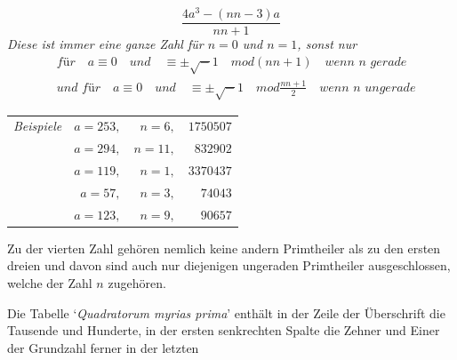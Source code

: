 \[
\frac{4a^3-(nn-3)a}{nn+1}
\]
\textit{Diese ist immer eine ganze Zahl für $n=0$ und $n=1$, sonst nur}
\[
\begin{aligned}
&\textit{für}\quad a\equiv0\quad\textit{und}\quad\equiv\pm\surd-1\quad mod(nn+1)\quad\textit{wenn }n\textit{ gerade}\\
&\textit{und für}\quad a\equiv0\quad\textit{und}\quad\equiv\pm\surd-1\quad mod\frac{nn+1}{2}\quad\textit{wenn }n\textit{ ungerade}
\end{aligned}
\]
\begin{center}
\begin{tabular}{lrrr}
\textit{Beispiele} & $a=253,$ & $n=6,$ & $1750507$\\
 & $a=294,$ & $n=11,$ & $832902$\\
 & $a=119,$ & $n=1,$ & $3370437$\\
 & $a=57,$ & $n=3,$ & $74043$\\
 & $a=123,$ & $n=9,$ & $90657$
\end{tabular}
\end{center}
\par Zu der vierten Zahl gehören nemlich keine andern Primtheiler als zu den ersten dreien und davon sind auch nur diejenigen ungeraden Primtheiler ausgeschlossen, welche der Zahl $n$ zugehören.
\par Die Tabelle ‘\textit{Quadratorum myrias prima}’ enthält in der Zeile der Überschrift die Tausende und Hunderte, in der ersten senkrechten Spalte die Zehner und Einer der Grundzahl ferner in der letzten
